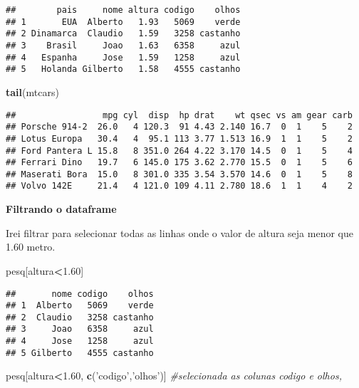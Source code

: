 \documentclass[]{article}
\newenvironment{Shaded}{\begin{snugshade}}{\end{snugshade}}
\newcommand{\KeywordTok}[1]{\textcolor[rgb]{0.13,0.29,0.53}{\textbf{#1}}}
\newcommand{\FloatTok}[1]{\textcolor[rgb]{0.00,0.00,0.81}{#1}}
\newcommand{\StringTok}[1]{\textcolor[rgb]{0.31,0.60,0.02}{#1}}
\newcommand{\CommentTok}[1]{\textcolor[rgb]{0.56,0.35,0.01}{\textit{#1}}}
\newcommand{\OperatorTok}[1]{\textcolor[rgb]{0.81,0.36,0.00}{\textbf{#1}}}
\newcommand{\NormalTok}[1]{#1}
\begin{document}
\begin{verbatim}
##        pais     nome altura codigo    olhos
## 1       EUA  Alberto   1.93   5069    verde
## 2 Dinamarca  Claudio   1.59   3258 castanho
## 3    Brasil     Joao   1.63   6358     azul
## 4   Espanha     Jose   1.59   1258     azul
## 5   Holanda Gilberto   1.58   4555 castanho
\end{verbatim}

\begin{Shaded}
\begin{Highlighting}[]
\KeywordTok{tail}\NormalTok{(mtcars)}
\end{Highlighting}
\end{Shaded}

\begin{verbatim}
##                 mpg cyl  disp  hp drat    wt qsec vs am gear carb
## Porsche 914-2  26.0   4 120.3  91 4.43 2.140 16.7  0  1    5    2
## Lotus Europa   30.4   4  95.1 113 3.77 1.513 16.9  1  1    5    2
## Ford Pantera L 15.8   8 351.0 264 4.22 3.170 14.5  0  1    5    4
## Ferrari Dino   19.7   6 145.0 175 3.62 2.770 15.5  0  1    5    6
## Maserati Bora  15.0   8 301.0 335 3.54 3.570 14.6  0  1    5    8
## Volvo 142E     21.4   4 121.0 109 4.11 2.780 18.6  1  1    4    2
\end{verbatim}

\textbf{Filtrando o dataframe}

Irei filtrar para selecionar todas as linhas onde o valor de altura seja
menor que 1.60 metro.

\begin{Shaded}
\begin{Highlighting}[]
\NormalTok{pesq[altura}\OperatorTok{<}\FloatTok{1.60}\NormalTok{]}
\end{Highlighting}
\end{Shaded}

\begin{verbatim}
##       nome codigo    olhos
## 1  Alberto   5069    verde
## 2  Claudio   3258 castanho
## 3     Joao   6358     azul
## 4     Jose   1258     azul
## 5 Gilberto   4555 castanho
\end{verbatim}

\begin{Shaded}
\begin{Highlighting}[]
\NormalTok{pesq[altura}\OperatorTok{<}\FloatTok{1.60}\NormalTok{, }\KeywordTok{c}\NormalTok{(}\StringTok{'codigo'}\NormalTok{,}\StringTok{'olhos'}\NormalTok{)] }\CommentTok{#selecionada as colunas codigo e olhos,}
\end{Highlighting}
\end{Shaded}
\end{document}

